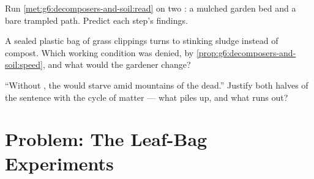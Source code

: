 \begin{exercise}[$\star\star$]\label{exo:g6:decomposers-and-soil:10}
Run \cref{met:g6:decomposers-and-soil:read} on two : a
mulched garden bed and a bare trampled path. Predict each
step's findings.
\end{exercise}

\begin{exercise}[$\star\star$]\label{exo:g6:decomposers-and-soil:11}
A sealed plastic bag of grass clippings turns to stinking
sludge instead of compost. Which working condition was
denied, by \cref{prop:g6:decomposers-and-soil:speed}, and
what would the gardener change?
\end{exercise}

\begin{exercise}[$\star\star\star$]\label{exo:g6:decomposers-and-soil:12}
``Without , the  would starve amid
mountains of the dead.'' Justify both halves of the
sentence with the cycle of matter --- what piles up, and
what runs out?
\end{exercise}

\section{Problem: The Leaf-Bag Experiments}

